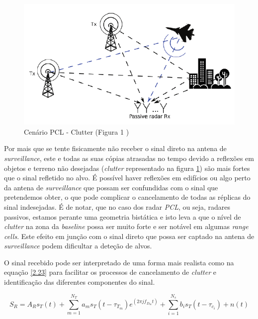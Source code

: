 \begin{figure}[h]
\centering
\includegraphics[scale=0.6]{chapters/ch2/assets/clutter}
\caption[Cenário PCL - Clutter]{Cenário PCL - Clutter (Figura 1 \cite{Peto2018})}
\label{fig:clutter}
\end{figure}


Por mais que se tente fisicamente não receber o sinal direto na antena de \textit{surveillance}, este e todas as suas cópias atrasadas no tempo devido a reflexões em objetos e terreno não desejadas (\textit{clutter} representado na figura \ref{fig:clutter}) são mais fortes que o sinal refletido no alvo. É possível haver reflexões em edifícios ou algo perto da antena de \textit{surveillance} que possam ser confundidas com o sinal que pretendemos obter, o que pode complicar o cancelamento de todas as réplicas do sinal indesejadas. É de notar, que no caso dos radar \textit{\gls{PCL}}, ou seja, radares passivos, estamos perante uma geometria bistática e isto leva a que o nível de \textit{clutter} na zona da \textit{baseline} possa ser muito forte e ser notável em algumas \textit{range cells}. Este efeito em junção com o sinal direto que possa ser captado na antena de \textit{surveillance} podem dificultar a deteção de alvos.\par 
O sinal recebido pode ser interpretado de uma forma mais realista como na equação \ref{2.23} para facilitar os processos de cancelamento de \textit{clutter} e identificação das diferentes componentes do sinal.


\begin{equation} \label{2.23}
S_{R}=A_{R}s_{T}\left( t\right)+\sum_{m=1}^{N_{T}}a_{m}s_{T}\left( t-\tau_{T_{m}}\right)e^{\left( 2\pi j f_{D_{m}}t\right)}+\sum_{i=1}^{N_{s}}b_{i}s_{T}\left( t-\tau_{c_{i}}\right)+n\left( t\right)    
\end{equation}

